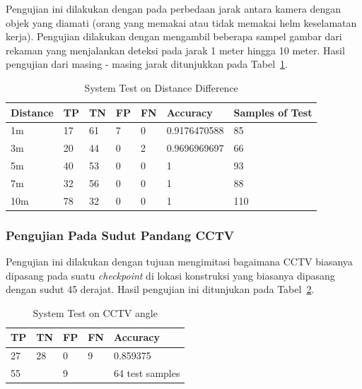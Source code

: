 \par Pengujian ini dilakukan dengan pada perbedaan jarak antara kamera dengan objek yang diamati (orang yang memakai atau tidak memakai helm keselamatan kerja). Pengujian dilakukan dengan mengambil beberapa sampel gambar dari rekaman yang menjalankan deteksi pada jarak 1 meter hingga 10 meter. Hasil pengujian dari masing - masing jarak ditunjukkan pada Tabel~\ref{tb:systest_dist_test}.

\begin{table}
  \centering
  \caption{System Test on Distance Difference}
  \label{tb:systest_dist_test}
  \begin{tabular}{|l|l|l|l|l|l|l|} 
  \hline
  Distance & TP & TN & FP & FN & Accuracy     & Samples of Test  \\ 
  \hline
  1m       & 17 & 61 & 7  & 0  & 0.9176470588 & 85               \\ 
  \hline
  3m       & 20 & 44 & 0  & 2  & 0.9696969697 & 66               \\ 
  \hline
  5m       & 40 & 53 & 0  & 0  & 1            & 93               \\ 
  \hline
  7m       & 32 & 56 & 0  & 0  & 1            & 88               \\ 
  \hline
  10m      & 78 & 32 & 0  & 0  & 1            & 110              \\
  \hline
  \end{tabular}
\end{table}


\subsubsection{Pengujian Pada Sudut Pandang CCTV}
\label{subsubsec:hedect_test_cctv}


\par Pengujian ini dilakukan dengan tujuan mengimitasi bagaimana CCTV biasanya dipasang pada suatu \emph{checkpoint} di lokasi konstruksi yang biasanya dipasang dengan sudut 45 derajat. Hasil pengujian ini ditunjukan pada Tabel~\ref{tb:systest_cctv}.

\begin{table}
  \centering
  \caption{System Test on CCTV angle}
  \label{tb:systest_cctv}
  \begin{tabular}{|l|l|l|l|l|} 
  \hline
  TP & TN & FP & FN & Accuracy         \\ 
  \hline
  27 & 28 & 0  & 9  & 0.859375         \\ 
  \hline
  \multicolumn{2}{|l|}{55}   & \multicolumn{2}{l|}{9} & 64 test samples  \\
  \hline
  \end{tabular}
\end{table}


